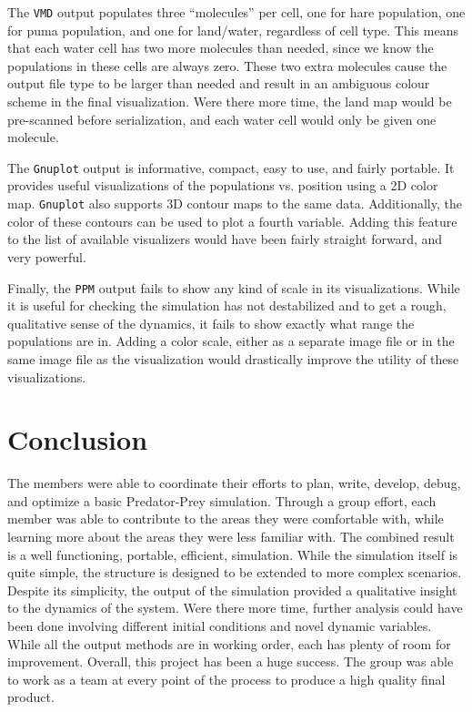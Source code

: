 \documentclass[a4paper,11pt]{article}
\begin{document}
The \texttt{VMD} output populates three ``molecules'' per cell, one for hare population, one for puma population, and one for land/water, regardless of cell type.  This means that each water cell has two more molecules than needed, since we know the populations in these cells are always zero.  These two extra molecules cause the output file type to be larger than needed and result in an ambiguous colour scheme in the final visualization.  Were there more time, the land map would be pre-scanned before serialization, and each water cell would only be given one molecule.

The \texttt{Gnuplot} output is informative, compact, easy to use, and fairly portable.  It provides useful visualizations of the populations vs. position using a 2D color map.   \texttt{Gnuplot} also supports 3D contour maps to the same data.  Additionally, the color of these contours can be used to plot a fourth variable.  Adding this feature to the list of available visualizers would have been fairly straight forward, and very powerful.  

Finally, the \texttt{PPM} output fails to show any kind of scale in its visualizations.  While it is useful for checking the simulation has not destabilized and to get a rough, qualitative sense of the dynamics, it fails to show exactly what range the populations are in.  Adding a color scale, either as a separate image file or in the same image file as the visualization would drastically improve the utility of these visualizations.
 
 \section{Conclusion}

The members were able to coordinate their efforts to plan, write, develop, debug, and optimize a basic Predator-Prey simulation.  Through a group effort, each member was able to contribute to the areas they were comfortable with, while learning more about the areas they were less familiar with.   The combined result is a well functioning, portable, efficient,   simulation.  While the simulation itself is quite simple, the structure is designed to be extended to more complex scenarios.  Despite its simplicity, the output of the simulation provided a qualitative insight to the dynamics of the system.  Were there more time, further analysis could have been done involving different initial conditions and novel dynamic variables.  While all the output methods are in working order, each has plenty of room for improvement.  Overall, this project has been a huge success.  The group was able to work as a team at every point of the process to produce a high quality final product. 
\end{document}
